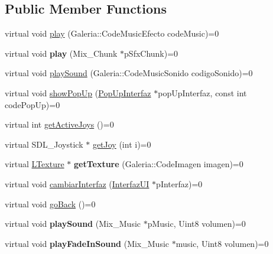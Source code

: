 \subsection*{Public Member Functions}
\begin{DoxyCompactItemize}
\item 
virtual void \hyperlink{class_game_manager_interfaz_u_i_abc1e55cd9dc327d26ef6fdbfcac05b42}{play} (Galeria\+::\+Code\+Music\+Efecto code\+Music)=0
\item 
virtual void {\bfseries play} (Mix\+\_\+\+Chunk $\ast$p\+Sfx\+Chunk)=0\hypertarget{class_game_manager_interfaz_u_i_aee33c5cc1a5031d8ebe5968b6de9940b}{}\label{class_game_manager_interfaz_u_i_aee33c5cc1a5031d8ebe5968b6de9940b}

\item 
virtual void \hyperlink{class_game_manager_interfaz_u_i_a8ab3930451a7a81829859eb56d72c676}{play\+Sound} (Galeria\+::\+Code\+Music\+Sonido codigo\+Sonido)=0
\item 
virtual void \hyperlink{class_game_manager_interfaz_u_i_a7adf014f12ad93b0a8f569d7d3108bf9}{show\+Pop\+Up} (\hyperlink{class_pop_up_interfaz}{Pop\+Up\+Interfaz} $\ast$pop\+Up\+Interfaz, const int code\+Pop\+Up)=0
\item 
virtual int \hyperlink{class_game_manager_interfaz_u_i_a98ad10caf36808dd0c626a69fa7ffd17}{get\+Active\+Joys} ()=0
\item 
virtual S\+D\+L\+\_\+\+Joystick $\ast$ \hyperlink{class_game_manager_interfaz_u_i_ae0126235dd0099fec45504dc70870032}{get\+Joy} (int i)=0
\item 
virtual \hyperlink{class_l_texture}{L\+Texture} $\ast$ {\bfseries get\+Texture} (Galeria\+::\+Code\+Imagen imagen)=0\hypertarget{class_game_manager_interfaz_u_i_af969f9a01c171fb5c61b1f63c5688003}{}\label{class_game_manager_interfaz_u_i_af969f9a01c171fb5c61b1f63c5688003}

\item 
virtual void \hyperlink{class_game_manager_interfaz_u_i_a9e20a361429abfcc57896fe01955c88e}{cambiar\+Interfaz} (\hyperlink{class_interfaz_u_i}{Interfaz\+UI} $\ast$p\+Interfaz)=0
\item 
virtual void \hyperlink{class_game_manager_interfaz_u_i_aa3ee961c35993d96325520a8176d51f6}{go\+Back} ()=0
\item 
virtual void {\bfseries play\+Sound} (Mix\+\_\+\+Music $\ast$p\+Music, Uint8 volumen)=0\hypertarget{class_game_manager_interfaz_u_i_a8f40ba0bbd33d5dbeee31cfc81aae7cd}{}\label{class_game_manager_interfaz_u_i_a8f40ba0bbd33d5dbeee31cfc81aae7cd}

\item 
virtual void {\bfseries play\+Fade\+In\+Sound} (Mix\+\_\+\+Music $\ast$music, Uint8 volumen)=0\hypertarget{class_game_manager_interfaz_u_i_a8ca83afc38b809b80e9eba8dd9f41ef3}{}\label{class_game_manager_interfaz_u_i_a8ca83afc38b809b80e9eba8dd9f41ef3}

\end{DoxyCompactItemize}


